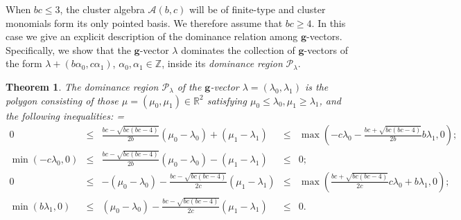 \documentclass{amsart}
\newtheorem{theorem}{Theorem}
\numberwithin{theorem}{section}
\newcommand{\bfg}{\boldsymbol{g}}
\newcommand{\cA}{\mathcal{A}}
\newcommand{\cP}{\mathcal{P}}
\newcommand{\RR}{\mathbb{R}}
\newcommand{\ZZ}{\mathbb{Z}}
\begin{document}
  When $bc\le3$, the cluster algebra $\cA(b,c)$ will be of finite-type and cluster monomials form its only pointed basis.
  We therefore assume that $bc\ge4$.
  In this case we give an explicit description of the dominance relation among $\bfg$-vectors.
  Specifically, we show that the $\bfg$-vector $\lambda$ dominates the collection of $\bfg$-vectors of the form $\lambda+(b \alpha_0 ,c \alpha_1)$, $\alpha_0,\alpha_1\in\ZZ$, inside its \emph{dominance region} $\cP_\lambda$.
  \begin{theorem}
    \label{th:dominance inequalities}
    The dominance region $\cP_\lambda$ of the $\bfg$-vector $\lambda=(\lambda_0,\lambda_1)$ is the polygon consisting of those $\mu=(\mu_0,\mu_1)\in\RR^2$ satisfying $\mu_0 \leq \lambda_0, \mu_1 \geq\lambda_1$, and the following inequalities:
    {
      \everymath={\displaystyle}
      \def\arraystretch{2.2}
      \[
        \begin{array}{rcccl}
          0 & \!\leq\! & \frac{b c-\sqrt{b c (b c-4)}}{2 b}(\mu_0-\lambda_0)+(\mu_1-\lambda_1) & \!\leq\! & \max\left(-c\lambda_0-\frac{b c+\sqrt{b c (b c-4)}}{2b}b\lambda_1,0\right)\!\!;
          \\
          \min\left(-c\lambda_0,0\right) & \!\leq\! & \frac{b c-\sqrt{b c (b c-4)}}{2 b}(\mu_0-\lambda_0)-(\mu_1-\lambda_1) & \!\leq\! & 0;
          \\
          0 & \!\leq\! &  -(\mu_0-\lambda_0)-\frac{b c-\sqrt{b c (b c-4)}}{2 c}(\mu_1-\lambda_1) & \!\leq\! & \max\left(\frac{b c+\sqrt{b c (b c-4)}}{2c}c\lambda_0+b\lambda_1,0\right)\!\!;
          \\
          \min\left(b \lambda_1,0\right) & \!\leq\! & (\mu_0-\lambda_0) - \frac{b c-\sqrt{b c (b c-4)}}{2 c} (\mu_1-\lambda_1) & \!\leq\! & 0.
        \end{array}
      \]
    }
    
  \vspace{-1.05em}
  \end{theorem}
\end{document}
